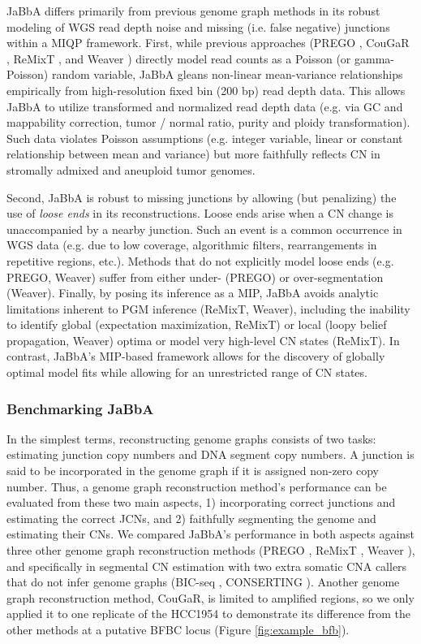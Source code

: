 \documentclass[phd,tocprelim]{cornell}
\begin{document}
JaBbA differs primarily from previous genome graph methods in its robust modeling of WGS read depth noise and missing (i.e. false negative) junctions within a MIQP framework. First, while previous approaches (PREGO \cite{Oesper2012-vw}, CouGaR \cite{Medvedev:2010bm}, ReMixT \cite{McPherson2017-ry}, and Weaver \cite{Li2016-qa}) directly model read counts as a Poisson (or gamma-Poisson) random variable, JaBbA gleans non-linear mean-variance relationships empirically from high-resolution fixed bin (200 bp) read depth data.  This allows JaBbA to utilize transformed and normalized read depth data (e.g. via GC and mappability correction, tumor / normal ratio, purity and ploidy transformation).  Such data violates Poisson assumptions (e.g. integer variable, linear or constant relationship between mean and variance) but more faithfully reflects CN in stromally admixed and aneuploid tumor genomes.

Second, JaBbA is robust to missing junctions by allowing (but penalizing) the use of \textit{loose ends} in its reconstructions.  Loose ends arise when a CN change is unaccompanied by a nearby junction. Such an event is a common occurrence in WGS data (e.g. due to low coverage, algorithmic filters, rearrangements in repetitive regions, etc.). Methods that do not explicitly model loose ends (e.g. PREGO, Weaver) suffer from either under- (PREGO) or over-segmentation (Weaver). Finally, by posing its inference as a MIP, JaBbA avoids analytic limitations inherent to PGM inference (ReMixT, Weaver), including the inability to identify global (expectation maximization, ReMixT) or local (loopy belief propagation, Weaver) optima or model very high-level CN states (ReMixT).  In contrast, JaBbA's MIP-based framework allows for the discovery of globally optimal model fits while allowing for an unrestricted range of CN states.

\subsubsection*{Benchmarking JaBbA}
In the simplest terms, reconstructing genome graphs consists of two tasks: estimating junction copy numbers and DNA segment copy numbers. A junction is said to be incorporated in the genome graph if it is assigned non-zero copy number. Thus, a genome graph reconstruction method's performance can be evaluated from these two main aspects, 1) incorporating correct junctions and estimating the correct JCNs, and 2) faithfully segmenting the genome and estimating their CNs. We compared JaBbA's performance in both aspects against three other genome graph reconstruction methods (PREGO \cite{Oesper2012-vw}, ReMixT \cite{McPherson2017-ry}, Weaver \cite{Li2016-qa}), and specifically in segmental CN estimation with two extra somatic CNA callers that do not infer genome graphs (BIC-seq \cite{Xi2011-oa}, CONSERTING \cite{Chen2015-sw}). Another genome graph reconstruction method, CouGaR, is limited to amplified regions, so we only applied it to one replicate of the HCC1954 to demonstrate its difference from the other methods at a putative BFBC locus (Figure \ref{fig:example_bfb}).
\end{document}
